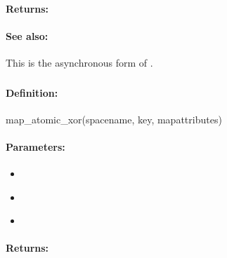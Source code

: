 \paragraph{Returns:}


\paragraph{See also:}  This is the asynchronous form of .

\pagebreak
\subsubsection{}
\label{api:ruby:map_atomic_xor}


\paragraph{Definition:}
\begin{rubycode}
map_atomic_xor(spacename, key, mapattributes)
\end{rubycode}

\paragraph{Parameters:}
\begin{itemize}[noitemsep]
\item {}\\

\item {}\\

\item {}\\

\end{itemize}

\paragraph{Returns:}


\pagebreak
\subsubsection{}
\label{api:ruby:async_map_atomic_xor}


